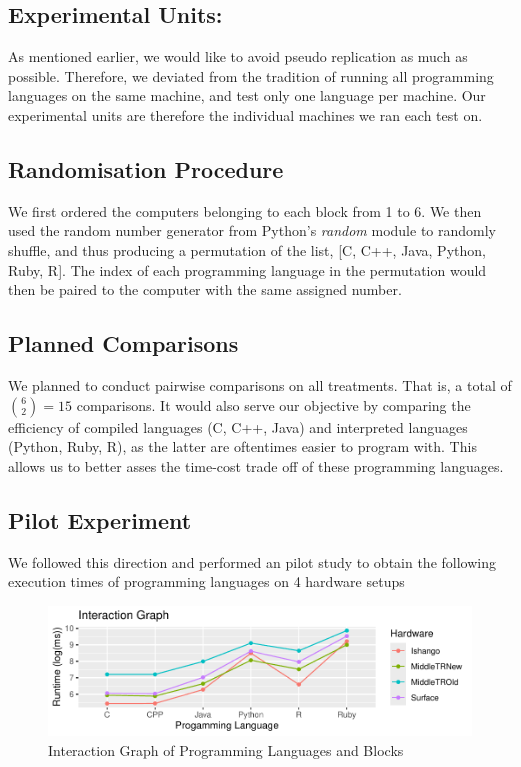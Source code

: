 \documentclass[12pt,halfline,a4paper,]{ouparticle}
\begin{document}
\subsection{Experimental Units:}\label{experimental-units}

As mentioned earlier, we would like to avoid pseudo replication as much
as possible. Therefore, we deviated from the tradition of running all
programming languages on the same machine, and test only one language
per machine. Our experimental units are therefore the individual
machines we ran each test on.

\subsection{Randomisation Procedure}\label{randomisation-procedure}

We first ordered the computers belonging to each block from 1 to 6. We
then used the random number generator from Python's \emph{random} module
to randomly shuffle, and thus producing a permutation of the list, {[}C,
C++, Java, Python, Ruby, R{]}. The index of each programming language in
the permutation would then be paired to the computer with the same
assigned number.

\subsection{Planned Comparisons}\label{planned-comparisons}

We planned to conduct pairwise comparisons on all treatments. That is, a
total of \(6 \choose 2\)\(=15\) comparisons. It would also serve our
objective by comparing the efficiency of compiled languages (C, C++,
Java) and interpreted languages (Python, Ruby, R), as the latter are
oftentimes easier to program with. This allows us to better asses the
time-cost trade off of these programming languages.

\subsection{Pilot Experiment}\label{pilot-experiment}

We followed this direction and performed an pilot study to obtain the
following execution times of programming languages on 4 hardware setups

\begin{figure}[H]
\includegraphics[width=1\linewidth]{skeleton_files/figure-latex/figPilot-1} \caption{Interaction Graph of Programming Languages and Blocks}\label{fig:figPilot}
\end{figure}
\end{document}
